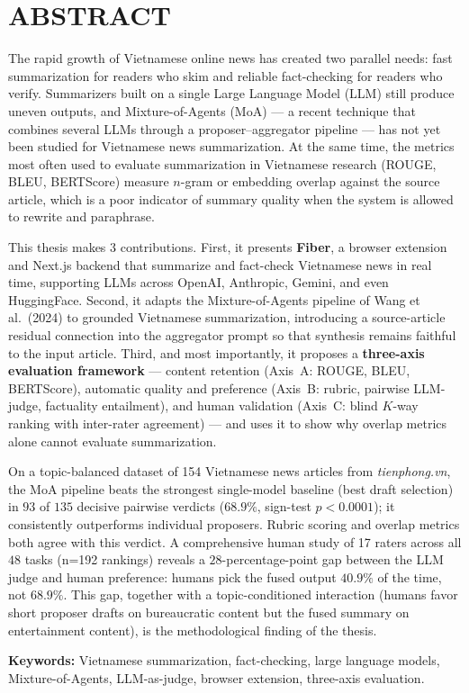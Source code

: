 \chapter*{ABSTRACT}

The rapid growth of Vietnamese online news has created two parallel needs:
fast summarization for readers who skim and reliable fact-checking for readers who
verify. Summarizers built on a single Large Language Model (LLM)
still produce uneven outputs, and Mixture-of-Agents (MoA) --- a recent technique
that combines several LLMs through a proposer--aggregator pipeline ---
has not yet been studied for Vietnamese news summarization. At the same time, the metrics most often
used to evaluate summarization in Vietnamese research (ROUGE, BLEU, BERTScore)
measure $n$-gram or embedding overlap against the source article, which is a poor
indicator of summary quality when the system is allowed to rewrite and paraphrase.

This thesis makes 3 contributions. First, it presents \textbf{Fiber}, a
browser extension and Next.js backend that summarize and fact-check Vietnamese
news in real time, supporting LLMs across OpenAI, Anthropic, Gemini, and even HuggingFace. Second, it adapts the Mixture-of-Agents pipeline of Wang et al.\ (2024)
to grounded Vietnamese summarization, introducing a source-article residual
connection into the aggregator prompt so that synthesis remains faithful to the
input article. Third, and most importantly, it proposes a
\textbf{three-axis evaluation framework} --- content retention (Axis~A: ROUGE,
BLEU, BERTScore), automatic quality and preference (Axis~B: rubric, pairwise
LLM-judge, factuality entailment), and human validation (Axis~C: blind $K$-way
ranking with inter-rater agreement) --- and uses it to show why
overlap metrics alone cannot evaluate summarization.

On a topic-balanced dataset of 154 Vietnamese news articles from
\textit{tienphong.vn}, the MoA pipeline beats the strongest single-model
baseline (best draft selection) in $93$ of $135$ decisive pairwise verdicts
($68.9\%$, sign-test $p < 0.0001$); it consistently outperforms individual proposers. Rubric scoring and overlap
metrics both agree with this verdict. A comprehensive human study of 17 raters across
all $48$ tasks (n=192 rankings) reveals a $28$-percentage-point gap between the
LLM judge and human preference: humans pick the fused output $40.9\%$ of the
time, not $68.9\%$. This gap, together with a topic-conditioned interaction
(humans favor short proposer drafts on bureaucratic content but the fused
summary on entertainment content), is the methodological finding of the thesis.

\vspace{0.4em}
\textbf{Keywords:} Vietnamese summarization, fact-checking, large language
models, Mixture-of-Agents, LLM-as-judge, browser extension, three-axis
evaluation.
